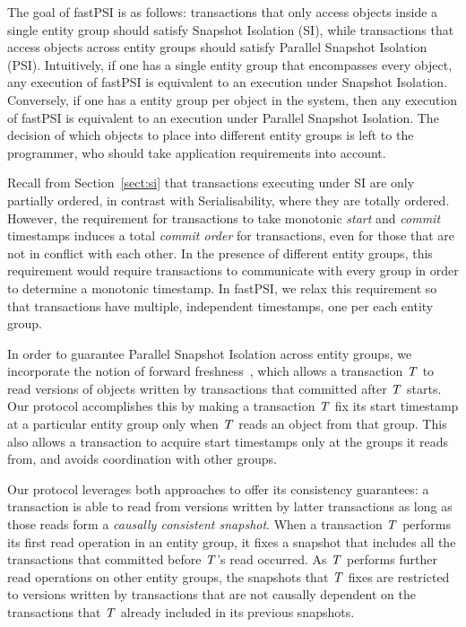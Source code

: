 The goal of fastPSI is as follows: transactions that only access objects inside a single entity group should satisfy Snapshot Isolation (SI), while transactions that access objects across entity groups should satisfy Parallel Snapshot Isolation (PSI). Intuitively, if one has a single entity group that encompasses every object, any execution of fastPSI is equivalent to an execution under Snapshot Isolation. Conversely, if one has a entity group per object in the system, then any execution of fastPSI is equivalent to an execution under Parallel Snapshot Isolation. The decision of which objects to place into different entity groups is left to the programmer, who should take application requirements into account.

Recall from Section~\ref{sect:si} that transactions executing under SI are only partially ordered, in contrast with Serialisability, where they are totally ordered. However, the requirement for transactions to take monotonic \emph{start} and \emph{commit} timestamps induces a total \emph{commit order} for transactions, even for those that are not in conflict with each other. In the presence of different entity groups, this requirement would require transactions to communicate with every group in order to determine a monotonic timestamp. In fastPSI, we relax this requirement so that transactions have multiple, independent timestamps, one per each entity group.

In order to guarantee Parallel Snapshot Isolation across entity groups, we incorporate the notion of forward freshness~\citep{ardekani_nmsi}, which allows a transaction $\mathit{T}$ to read versions of objects written by transactions that committed after $\mathit{T}$ starts. Our protocol accomplishes this by making a transaction $\mathit{T}$ fix its start timestamp at a particular entity group only when $\mathit{T}$ reads an object from that group. This also allows a transaction to acquire start timestamps only at the groups it reads from, and avoids coordination with other groups.

Our protocol leverages both approaches to offer its consistency guarantees: a transaction is able to read from versions written by latter transactions as long as those reads form a \emph{causally consistent snapshot}. When a transaction $\mathit{T}$ performs its first read operation in an entity group, it fixes a snapshot that includes all the transactions that committed before $\mathit{T}$'s read occurred. As $\mathit{T}$ performs further read operations on other entity groups, the snapshots that $\mathit{T}$ fixes are restricted to versions written by transactions that are not causally dependent on the transactions that $\mathit{T}$ already included in its previous snapshots.

